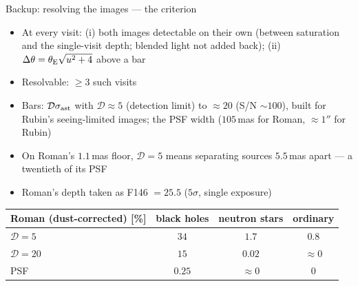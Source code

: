 \begin{frame}{Backup: resolving the images --- the criterion}
\begin{itemize}
  \item At every visit: (i) both images detectable on their own (between saturation and the single-visit depth; blended
        light not added back); (ii) $\Delta\theta=\theta_{\rm E}\sqrt{u^2+4}$ above a bar
  \item Resolvable: $\ge3$ such visits
  \item Bars: $\mathcal{D}\sigma_{\rm ast}$ with $\mathcal{D}\approx5$ (detection limit) to $\approx20$ (S/N $\sim100$),
        built for Rubin's seeing-limited images; the PSF width ($105$\,mas for Roman, $\approx1''$ for Rubin)
  \item On Roman's $1.1$\,mas floor, $\mathcal{D}=5$ means separating sources $5.5$\,mas apart --- a twentieth of its PSF
  \item Roman's depth taken as F146 $=25.5$ ($5\sigma$, single exposure)
\end{itemize}
\vspace{2mm}
\centering\small
\begin{tabular}{lccc}
\toprule
Roman (dust-corrected) [\%] & black holes & neutron stars & ordinary \\
\midrule
$\mathcal{D}=5$ & $34$ & $1.7$ & $0.8$ \\
$\mathcal{D}=20$ & $15$ & $0.02$ & $\approx0$ \\
PSF & $0.25$ & $\approx0$ & $0$ \\
\bottomrule
\end{tabular}
\vfill
{}
\end{frame}

